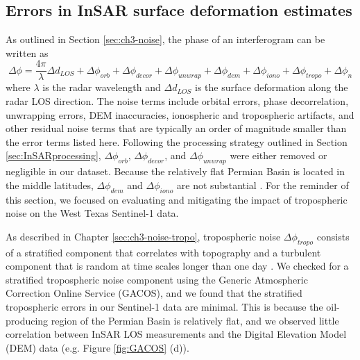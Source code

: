 \subsection{Errors in InSAR surface deformation estimates}
\label{sec:errors} 
As outlined in Section \ref{sec:ch3-noise}, the phase of an interferogram can be written as \citep{Zebker1992DecorrelationInterferometricRadar, Zebker1994AccuracyTopographicMaps, Zebker1997AtmosphericEffectsInterferometric}
\begin{equation}
	\Delta \phi = \frac{4 \pi}{\lambda} \Delta d_{LOS} +  \Delta \phi_{orb} + \Delta \phi_{decor} + \Delta \phi_{unwrap}  + \Delta \phi_{dem} + \Delta \phi_{iono} + \Delta \phi_{tropo}  + \Delta \phi_{n}
\end{equation}
where $ \lambda $ is the radar wavelength and $ \Delta d_{LOS} $ is the surface deformation along the radar LOS direction. The noise terms include orbital errors, phase decorrelation, unwrapping errors, DEM inaccuracies, ionospheric and tropospheric artifacts, and other residual noise terms that are typically an order of magnitude smaller than the error terms listed here. Following the processing strategy outlined in Section \ref{sec:InSARprocessing}, $\Delta \phi_{orb}$, $\Delta \phi_{decor}$, and $\Delta \phi_{unwrap}$ were either removed or negligible in our dataset. Because the relatively flat Permian Basin is located in the middle latitudes, $\Delta \phi_{dem}$ and $\Delta \phi_{iono}$ are not substantial \citep{Fattahi2013DemErrorCorrection, Liang2019IonosphericCorrectionInsar}. For the reminder of this section, we focused on evaluating and mitigating the impact of tropospheric noise on the West Texas Sentinel-1 data.


%


As described in Chapter \ref{sec:ch3-noise-tropo}, tropospheric noise $\Delta \phi_{tropo}$ consists of a stratified component that correlates with topography \citep{Doin2009CorrectionsStratifiedTropospheric} and a turbulent component that is random at time scales longer than one day \citep{Emardson2003NeutralAtmosphericDelay}. We checked for a stratified tropospheric noise component using the Generic Atmospheric Correction Online Service (GACOS), and we found that the stratified tropospheric errors in our Sentinel-1 data are minimal. This is because the oil-producing region of the Permian Basin is relatively flat, and we observed little correlation between InSAR LOS measurements and the Digital Elevation Model (DEM) data (e.g. Figure \ref{fig:GACOS} (d)). 



